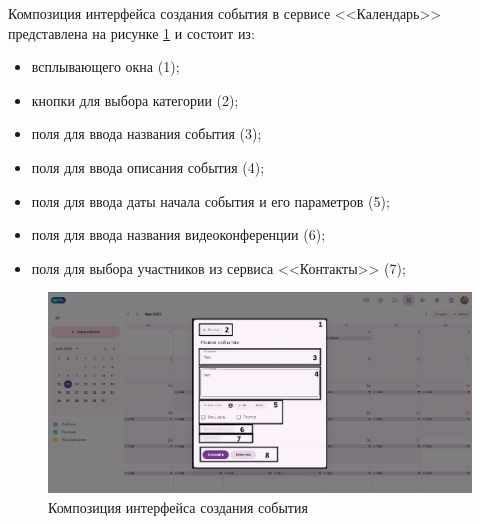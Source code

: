 Композиция интерфейса создания события в сервисе <<Календарь>> представлена на рисунке \ref{templ:image3b} и состоит из:
\begin{itemize}
  \item всплывающего окна (1);
  \item кнопки для выбора категории (2);
  \item поля для ввода названия события (3);
  \item поля для ввода описания события (4);
  \item поля для ввода даты начала события и его параметров (5);
  \item поля для ввода названия видеоконференции (6);
  \item поля для выбора участников из сервиса <<Контакты>> (7);
\end{itemize}
\begin{figure}[H]
	\centering
	\includegraphics[width=1\linewidth]{images/календарь2}
	\caption{Композиция интерфейса создания события}
	\label{templ:image3b}
\end{figure}

